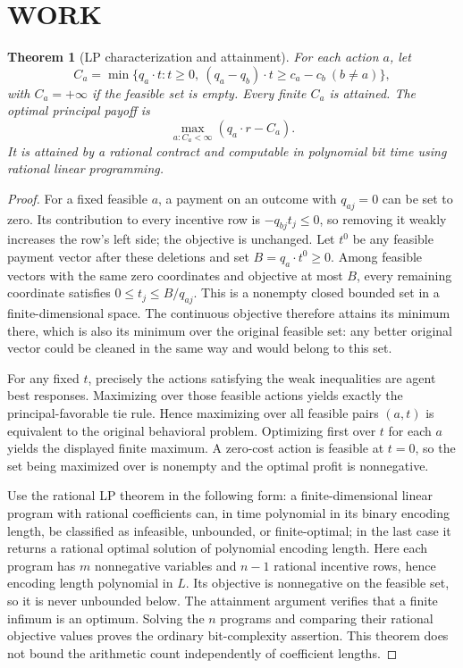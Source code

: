 \documentclass[11pt,a4paper]{article}
\newtheorem{theorem}{Theorem}[section]
\theoremstyle{definition}\newtheorem{definition}[theorem]{Definition}
\theoremstyle{remark}\newtheorem{remark}[theorem]{Remark}
\newcommand{\1}{\mathbf 1}
\begin{document}
\section{WORK}
\begin{theorem}[LP characterization and attainment]\label{thm:lp}
For each action $a$, let
\[
 C_a=\min\{q_a\cdot t:t\ge0,\ (q_a-q_b)\cdot t\ge c_a-c_b\ (b\ne a)\},
\]
with $C_a=+\infty$ if the feasible set is empty. Every finite $C_a$ is attained. The optimal principal payoff is
\[
 \max_{a:C_a<\infty}(q_a\cdot r-C_a).
\]
It is attained by a rational contract and computable in polynomial bit time using rational linear programming.
\end{theorem}
\begin{proof}
For a fixed feasible $a$, a payment on an outcome with $q_{aj}=0$ can be set to zero. Its contribution to every incentive row is $-q_{bj}t_j\le0$, so removing it weakly increases the row's left side; the objective is unchanged. Let $t^0$ be any feasible payment vector after these deletions and set $B=q_a\cdot t^0\ge0$. Among feasible vectors with the same zero coordinates and objective at most $B$, every remaining coordinate satisfies $0\le t_j\le B/q_{aj}$. This is a nonempty closed bounded set in a finite-dimensional space. The continuous objective therefore attains its minimum there, which is also its minimum over the original feasible set: any better original vector could be cleaned in the same way and would belong to this set.

For any fixed $t$, precisely the actions satisfying the weak inequalities are agent best responses. Maximizing over those feasible actions yields exactly the principal-favorable tie rule. Hence maximizing over all feasible pairs $(a,t)$ is equivalent to the original behavioral problem. Optimizing first over $t$ for each $a$ yields the displayed finite maximum. A zero-cost action is feasible at $t=0$, so the set being maximized over is nonempty and the optimal profit is nonnegative.

Use the rational LP theorem in the following form: a finite-dimensional linear program with rational coefficients can, in time polynomial in its binary encoding length, be classified as infeasible, unbounded, or finite-optimal; in the last case it returns a rational optimal solution of polynomial encoding length. Here each program has $m$ nonnegative variables and $n-1$ rational incentive rows, hence encoding length polynomial in $L$. Its objective is nonnegative on the feasible set, so it is never unbounded below. The attainment argument verifies that a finite infimum is an optimum. Solving the $n$ programs and comparing their rational objective values proves the ordinary bit-complexity assertion. This theorem does not bound the arithmetic count independently of coefficient lengths.
\end{proof}
\end{document}
